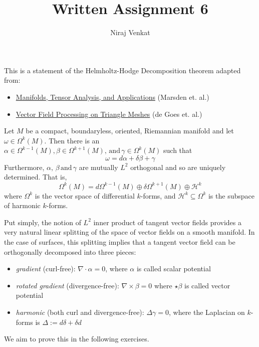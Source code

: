 \documentclass{article}
\def\grad{\nabla}
\def\lap{\Delta}
\def\cH{\mathcal{H}}
\begin{document}
\title{Written Assignment 6}

\author{Niraj Venkat}

\date{}

\maketitle

\vspace{.8cm}

This is a statement of the Helmholtz-Hodge Decomposition theorem adapted from:
\begin{itemize}
    \item \href{https://brickisland.net/DDGSpring2021/2021/03/18/book-recommendation-for-differential-forms/}{Manifolds, Tensor Analysis, and Applications}
    (Marsden et. al.)
    \item \href{https://dl.acm.org/doi/10.1145/2818143.2818167}{Vector Field Processing on Triangle Meshes}
    (de Goes et. al.)
\end{itemize}

\begin{mdframed}
    Let $M$ be a compact, boundaryless, oriented, Riemannian manifold and let $\omega \in \Omega^k(M)$.
    Then there is an $\alpha \in \Omega^{k-1}(M), \beta \in \Omega^{k+1}(M), \,\text{and}\, \gamma \in \Omega^k(M)$ such that
    $$\omega = d\alpha + \delta\beta + \gamma$$
    Furthermore, $\alpha, \,\beta \,\text{and}\, \gamma$ are mutually $L^2$ orthogonal
    and so are uniquely determined. That is,
    $$\Omega^k(M) = d\Omega^{k-1}(M) \oplus \delta\Omega^{k+1}(M) \oplus \cH^k$$
    where $\Omega^k$ is the vector space of differential $k$-forms, and $\cH^k \subseteq \Omega^k$ is the subspace of harmonic $k$-forms.
\end{mdframed}

Put simply, the notion of $L^2$ inner product of tangent vector fields provides a very natural linear splitting 
of the space of vector fields on a smooth manifold. In the case of surfaces, this splitting implies that a 
tangent vector field can be orthogonally decomposed into three pieces:
\begin{itemize}
    \item \emph{gradient} (curl-free): $\grad \cdot \alpha = 0$, where $\alpha$ is called scalar potential
    \item \emph{rotated gradient} (divergence-free): $\grad \times \beta = 0$ where $\star\beta$ is called vector potential
    \item \emph{harmonic} (both curl and divergence-free): $\lap \gamma = 0$, where the Laplacian on $k$-forms is
    $\lap := d\delta + \delta d$
\end{itemize}
We aim to prove this in the following exercises.
\end{document}
